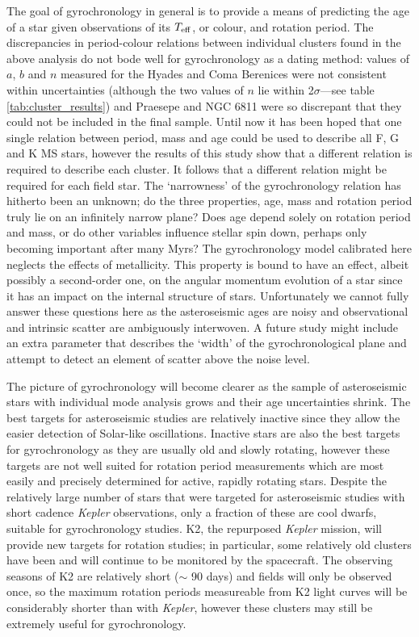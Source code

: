 \documentclass[10pt,preprint]{aastex}
\newcommand{\teff}{$T_{\rm{eff}}$}
\begin{document}
The goal of gyrochronology in general is to provide a means of predicting the age of a star given observations of its \teff, or colour, and rotation period.
The discrepancies in period-colour relations between individual clusters found in the above analysis do not bode well for gyrochronology as a dating method: values of $a$, $b$ and $n$ measured for the Hyades and Coma Berenices were not consistent within uncertainties (although the two values of $n$ lie within 2$\sigma$---see table \ref{tab:cluster_results}) and Praesepe and NGC 6811 were so discrepant that they could not be included in the final sample.
Until now it has been hoped that one single relation between period, mass and age could be used to describe all F, G and K MS stars, however the results of this study show that a different relation is required to describe each cluster.
It follows that a different relation might be required for each field star.
The `narrowness' of the gyrochronology relation has hitherto been an unknown; do the three properties, age, mass and rotation period truly lie on an infinitely narrow plane?
Does age depend solely on rotation period and mass, or do other variables influence stellar spin down, perhaps only becoming important after many Myrs?
The gyrochronology model calibrated here neglects the effects of metallicity.
This property is bound to have an effect, albeit possibly a second-order one, on the angular momentum evolution of a star since it has an impact on the internal structure of stars.
Unfortunately we cannot fully answer these questions here as the asteroseismic ages are noisy and observational and intrinsic scatter are ambiguously interwoven.
A future study might include an extra parameter that describes the `width' of the gyrochronological plane and attempt to detect an element of scatter above the noise level.

The picture of gyrochronology will become clearer as the sample of asteroseismic stars with individual mode analysis grows and their age uncertainties shrink.
The best targets for asteroseismic studies are relatively inactive since they allow the easier detection of Solar-like oscillations.
Inactive stars are also the best targets for gyrochronology as they are usually old and slowly rotating, however these targets are not well suited for rotation period measurements which are most easily and precisely determined for active, rapidly rotating stars.
Despite the relatively large number of stars that were targeted for asteroseismic studies with short cadence {\it Kepler} observations, only a fraction of these are cool dwarfs, suitable for gyrochronology studies.
K2, the repurposed {\it Kepler} mission, will provide new targets for rotation studies; in particular, some relatively old clusters have been and will continue to be monitored by the spacecraft.
The observing seasons of K2 are relatively short ($\sim$ 90 days) and fields will only be observed once, so the maximum rotation periods measureable from K2 light curves will be considerably shorter than with {\it Kepler}, however these clusters may still be extremely useful for gyrochronology.
\end{document}
